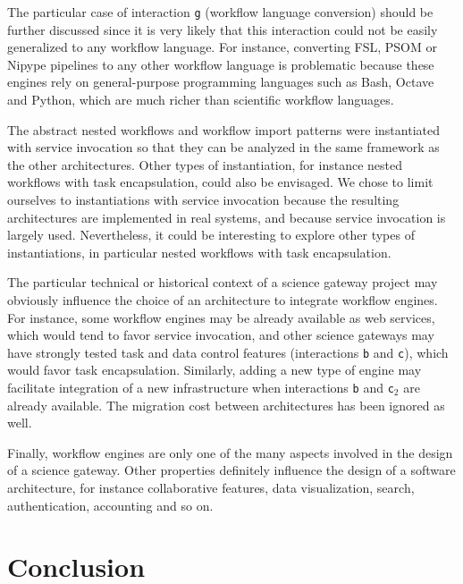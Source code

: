 \documentclass[preprint,3p,twocolumn]{elsarticle}
\begin{document}
The particular case of interaction \texttt{g} (workflow language
conversion) should be further discussed since it is very likely that
this interaction could not be easily generalized to any workflow
language. For instance, converting FSL, PSOM or Nipype pipelines to
any other workflow language is problematic because these engines rely
on general-purpose programming languages such as Bash, Octave and
Python, which are much richer than scientific workflow languages.

The abstract nested workflows and workflow import patterns were
instantiated with service invocation so that they can be analyzed in
the same framework as the other architectures. Other types of
instantiation, for instance nested workflows with task encapsulation,
could also be envisaged. We chose to limit ourselves to instantiations
with service invocation because the resulting architectures are
implemented in real systems, and because service invocation is largely
used. Nevertheless, it could be interesting to explore other types of
instantiations, in particular nested workflows with task
encapsulation.

The particular technical or historical context of a science gateway
project may obviously influence the choice of an architecture to
integrate workflow engines. For instance, some workflow engines may be
already available as web services, which would tend to favor service
invocation, and other science gateways may have strongly tested task
and data control features (interactions \texttt{b} and \texttt{c}),
which would favor task encapsulation. Similarly, adding a new type of engine
may facilitate integration of a new infrastructure when interactions
\texttt{b} and \texttt{c$_2$} are already available. The migration
cost between architectures has been ignored as well.

Finally, workflow engines are only one of the many aspects involved in
the design of a science gateway. Other properties definitely influence
the design of a software architecture, for instance collaborative
features, data visualization, search, authentication, accounting and
so on.

\section{Conclusion}
\end{document}

